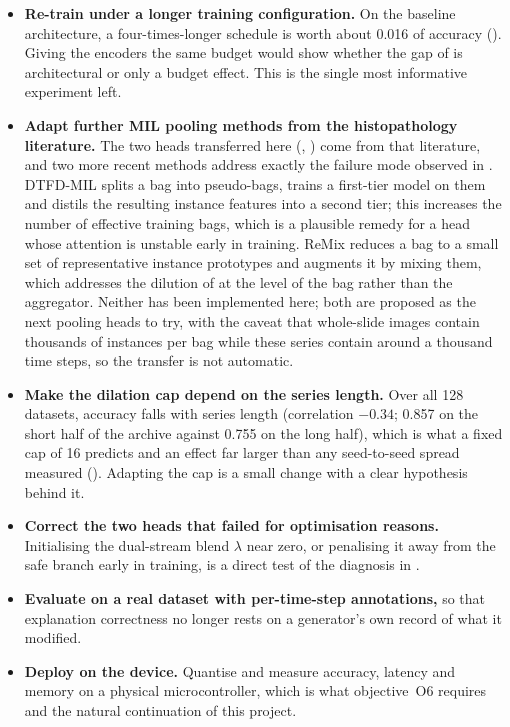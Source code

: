 \begin{itemize}\itemsep3pt
  \item \textbf{Re-train \seanet{} under a longer training configuration.} On the baseline
        architecture, a four-times-longer schedule is worth about 0.016 of \ucr{} accuracy
        (). Giving the \seanet{} encoders the same budget would show whether the
        \ucr{} gap of  is architectural or only a budget effect. This is the single
        most informative experiment left.

  \item \textbf{Adapt further MIL pooling methods from the histopathology literature.} The two heads
        transferred here (, ) come from that literature,
        and two more recent methods address exactly the failure mode observed in
        . DTFD-MIL \citep{zhang2022dtfdmil} splits a bag into pseudo-bags,
        trains a first-tier model on them and distils the resulting instance features into a
        second tier; this increases the number of effective training bags, which is a plausible
        remedy for a head whose attention is unstable early in training. ReMix
        \citep{yang2022remix} reduces a bag to a small set of representative instance prototypes and
        augments it by mixing them, which addresses the dilution of  at the level
        of the bag rather than the aggregator. Neither has been implemented here; both are proposed
        as the next pooling heads to try, with the caveat that whole-slide images contain thousands
        of instances per bag while these series contain around a thousand time steps, so the
        transfer is not automatic.

  \item \textbf{Make the dilation cap depend on the series length.} Over all 128 \ucr{} datasets,
        accuracy falls with series length (correlation $-0.34$; 0.857 on the short half of the
        archive against 0.755 on the long half), which is what a fixed cap of 16 predicts and an
        effect far larger than any seed-to-seed spread measured (). Adapting the cap
        is a small change with a clear hypothesis behind it.

  \item \textbf{Correct the two heads that failed for optimisation reasons.} Initialising the
        dual-stream blend $\lambda$ near zero, or penalising it away from the safe branch early in
        training, is a direct test of the diagnosis in .

  \item \textbf{Evaluate on a real dataset with per-time-step annotations,} so that explanation
        correctness no longer rests on a generator's own record of what it modified.

  \item \textbf{Deploy on the device.} Quantise \mbot{} \citep{jacob2018quantization} and measure
        accuracy, latency and memory on a physical microcontroller, which is what objective~O6
        requires and the natural continuation of this project.
\end{itemize}

